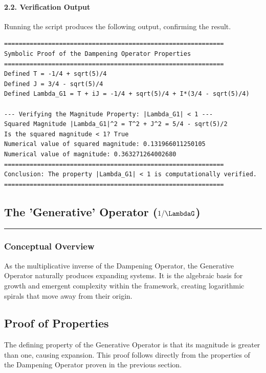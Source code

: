 \paragraph{2.2. Verification Output}
Running the script produces the following output, confirming the result.
\begin{verbatim}
============================================================
Symbolic Proof of the Dampening Operator Properties
============================================================
Defined T = -1/4 + sqrt(5)/4
Defined J = 3/4 - sqrt(5)/4
Defined Lambda_G1 = T + iJ = -1/4 + sqrt(5)/4 + I*(3/4 - sqrt(5)/4)

--- Verifying the Magnitude Property: |Lambda_G1| < 1 ---
Squared Magnitude |Lambda_G1|^2 = T^2 + J^2 = 5/4 - sqrt(5)/2
Is the squared magnitude < 1? True
Numerical value of squared magnitude: 0.131966011250105
Numerical value of magnitude: 0.363271264002680
============================================================
Conclusion: The property |Lambda_G1| < 1 is computationally verified.
============================================================
\end{verbatim}


\subsection*{The 'Generative' Operator ($1/\LambdaG$)}
\hrule
\vspace{0.3cm}
\vspace{0.5cm}

\subsubsection*{Conceptual Overview}
As the multiplicative inverse of the Dampening Operator, the Generative Operator naturally produces expanding systems. It is the algebraic basis for growth and emergent complexity within the framework, creating logarithmic spirals that move away from their origin.

\subsection*{Proof of Properties}
The defining property of the Generative Operator is that its magnitude is greater than one, causing expansion. This proof follows directly from the properties of the Dampening Operator proven in the previous section.

